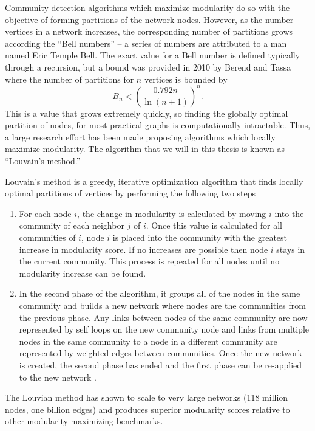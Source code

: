 \documentclass[../thesis.tex]{subfiles}
\begin{document}
Community detection algorithms which maximize modularity do so with the
objective of forming partitions of the network nodes. However, as the number
vertices in a network increases, the corresponding number of partitions grows
according the ``Bell numbers'' -- a series of numbers are attributed to a man
named Eric Temple Bell. The exact value for a Bell number is defined typically
through a recursion, but a bound was provided in 2010 by Berend and Tassa
\cite{berend2010improved} where the number of partitions for $n$ vertices is
bounded by
\begin{equation}
    B_n < \left(\frac{0.792n}{\ln(n + 1)} \right)^n.
\end{equation}
This is a value that grows extremely quickly, so finding the globally optimal
partition of nodes, for most practical graphs is computationally intractable.
Thus, a large research effort has been made proposing algorithms which locally
maximize modularity. The algorithm that we will in this thesis is known as
``Louvain's method.''

Louvain's method is a greedy, iterative optimization algorithm that finds
locally optimal partitions of vertices by performing the following two steps
\begin{enumerate}
    \item For each node $i$, the change in modularity is calculated by moving
    $i$ into the community of each neighbor $j$ of $i$. Once this value is
    calculated for all communities of $i$, node $i$ is placed into the community
    with the greatest increase in modularity score. If no increases are possible
    then node $i$ stays in the current community. This process is repeated for
    all nodes until no modularity increase can be found.
    \item In the second phase of the algorithm, it groups all of the nodes in
    the same community and builds a new network where nodes are the communities
    from the previous phase. Any links between nodes of the same community are
    now represented by self loops on the new community node and links from
    multiple nodes in the same community to a node in a different community are
    represented by weighted edges between communities. Once the new network is
    created, the second phase has ended and the first phase can be re-applied to
    the new network \cite{blondel2008fast}.
\end{enumerate}
The Louvian method has shown to scale to very large networks (118 million nodes,
one billion edges) and produces superior modularity scores relative to other
modularity maximizing benchmarks.
\end{document}
